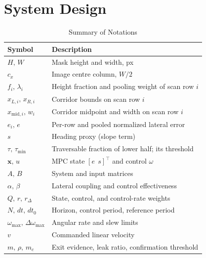 \documentclass[conference]{IEEEtran}
\begin{document}
\section{System Design}

\begin{table}[t]
\caption{Summary of Notations}
\label{tab:notation}
\centering
\begin{tabular}{ll}
\toprule
Symbol & Description \\
\midrule
$H,\,W$ & Mask height and width, px \\
$c_x$ & Image centre column, $W/2$ \\
$f_i,\,\lambda_i$ & Height fraction and pooling weight of scan row $i$ \\
$x_{L,i},\,x_{R,i}$ & Corridor bounds on scan row $i$ \\
$x_{\mathrm{mid},i},\,w_i$ & Corridor midpoint and width on scan row $i$ \\
$e_i,\,e$ & Per-row and pooled normalized lateral error \\
$s$ & Heading proxy (slope term) \\
$\tau,\,\tau_{\min}$ & Traversable fraction of lower half; its threshold \\
$\mathbf{x},\,u$ & MPC state $[e\;\,s]^{\!\top}$ and control $\omega$ \\
$A,\,B$ & System and input matrices \\
$\alpha,\,\beta$ & Lateral coupling and control effectiveness \\
$Q,\,r,\,r_\Delta$ & State, control, and control-rate weights \\
$N,\,dt,\,dt_0$ & Horizon, control period, reference period \\
$\omega_{\max},\,\Delta\omega_{\max}$ & Angular rate and slew limits \\
$v$ & Commanded linear velocity \\
$m,\,\rho,\,m_c$ & Exit evidence, leak ratio, confirmation threshold \\
\bottomrule
\end{tabular}
\end{table}
\end{document}
